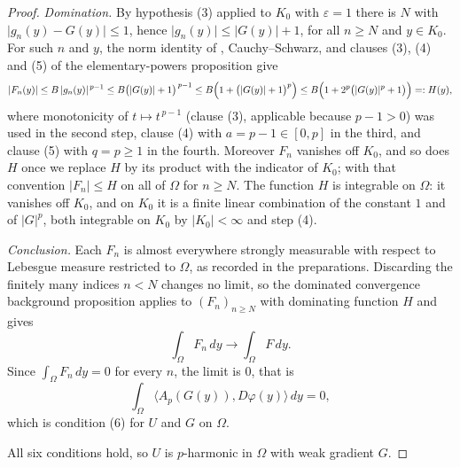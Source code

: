 \begin{proof}
\emph{Domination.}  By hypothesis (3) applied to $K_0$ with $\varepsilon=1$ there is $N$ with
$\lvert g_n(y)-G(y)\rvert\le1$, hence $\lvert g_n(y)\rvert\le\lvert G(y)\rvert+1$, for all
$n\ge N$ and $y\in K_0$.  For such $n$ and $y$, the norm identity of ,
Cauchy--Schwarz, and clauses (3), (4) and (5) of the elementary-powers proposition give
\[
  \lvert F_n(y)\rvert
  \le B\,\lvert g_n(y)\rvert^{\,p-1}
  \le B\bigl(\lvert G(y)\rvert+1\bigr)^{\,p-1}
  \le B\Bigl(1+\bigl(\lvert G(y)\rvert+1\bigr)^{p}\Bigr)
  \le B\Bigl(1+2^{p}\bigl(\lvert G(y)\rvert^{p}+1\bigr)\Bigr)=:H(y),
\]
where monotonicity of $t\mapsto t^{\,p-1}$ (clause (3), applicable because $p-1>0$) was used in
the second step, clause (4) with $a=p-1\in[0,p]$ in the third, and clause (5) with $q=p\ge1$ in
the fourth.  Moreover $F_n$ vanishes off $K_0$, and so does $H$ once we replace $H$ by its
product with the indicator of $K_0$; with that convention $\lvert F_n\rvert\le H$ on all of
$\Omega$ for $n\ge N$.  The function $H$ is integrable on $\Omega$: it vanishes off $K_0$, and
on $K_0$ it is a finite linear combination of the constant $1$ and of
$\lvert G\rvert^{p}$, both integrable on $K_0$ by $\lvert K_0\rvert<\infty$ and step (4).

\emph{Conclusion.}  Each $F_n$ is almost everywhere strongly measurable with respect to
Lebesgue measure restricted to $\Omega$, as recorded in the preparations.  Discarding the
finitely many indices $n<N$ changes no limit, so the dominated convergence background
proposition applies to $(F_n)_{n\ge N}$ with dominating function $H$ and gives
\[
  \int_\Omega F_n\,dy\longrightarrow\int_\Omega F\,dy .
\]
Since $\int_\Omega F_n\,dy=0$ for every $n$, the limit is $0$, that is
\[
  \int_\Omega\bigl\langle A_p(G(y)),D\varphi(y)\bigr\rangle\,dy=0 ,
\]
which is condition (6) for $U$ and $G$ on $\Omega$.

\medskip\noindent All six conditions hold, so $U$ is $p$-harmonic in $\Omega$ with weak
gradient $G$.
\end{proof}

